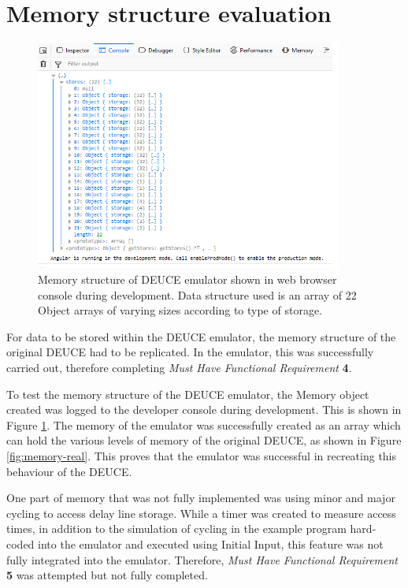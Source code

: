 \documentclass{l4proj}
\begin{document}
\section{Memory structure evaluation}

\begin{figure}[h!]
	\includegraphics[width=0.9\textwidth]{images/memory-emu}
	\caption{Memory structure of DEUCE emulator shown in web browser console during development. Data structure used is an array of 22 Object arrays of varying sizes according to type of storage.}
	\label{fig:memory-emu}
\end{figure}

For data to be stored within the DEUCE emulator, the memory structure of the original DEUCE had to be replicated. In the emulator, this was successfully carried out, therefore completing \textit{Must Have Functional Requirement} \textbf{4}.

To test the memory structure of the DEUCE emulator, the Memory object created was logged to the developer console during development. This is shown in Figure \ref{fig:memory-emu}. The memory of the emulator was successfully created as an array which can hold the various levels of memory of the original DEUCE, as shown in Figure \ref{fig:memory-real}. This proves that the emulator was successful in recreating this behaviour of the DEUCE.

One part of memory that was not fully implemented was using minor and major cycling to access delay line storage. While a timer was created to measure access times, in addition to the simulation of cycling in the example program hard-coded into the emulator and executed using Initial Input, this feature was not fully integrated into the emulator. Therefore, \textit{Must Have Functional Requirement} \textbf{5} was attempted but not fully completed.
\end{document}
